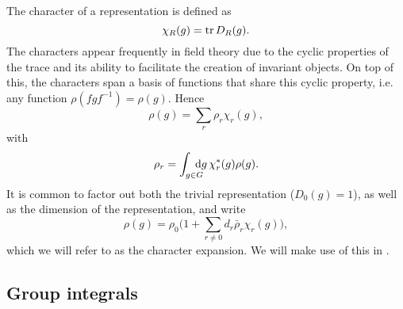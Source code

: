 The character of a representation is defined as
%
\begin{equation}
  \chi_R(g) = \operatorname{tr} D_R(g).
\end{equation}
%
The characters appear frequently in field theory due to the cyclic properties of
the trace and its ability to facilitate the creation of invariant objects. On
top of this, the characters span a basis of functions that share this cyclic
property, i.e. any function $\rho(f g f^{-1}) = \rho(g)$. Hence
%
\begin{equation}
  \rho(g) = \sum_r \rho_r \chi_r(g),
\end{equation}
%
with
\begin{equation}
  \rho_r = \int_{\mathrlap{g \in G}\hskip1.5ex} \mathrm{d}g \, \chi_r^*(g) \rho(g).
\end{equation}
%
It is common to factor out both the trivial representation ($D_0(g) = 1$), as
well as the dimension of the representation, and write
%
\begin{equation}
  \rho(g) = \rho_0 \Big(1 + \sum_{r \neq 0} d_r \bar{\rho}_r \chi_r(g)\Big),
\end{equation}
%
which we will refer to as the character expansion. We will make use of this in
.

\subsection{Group integrals}

